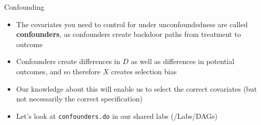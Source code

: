 \documentclass{beamer}
\begin{document}
\begin{frame}{Confounding}

  \begin{itemize}
  	\item The covariates you need to control for under unconfoundedness are called \textbf{confounders}, as confounders create backdoor paths from treatment to outcome
          \item Confounders create differences in $D$ as well as differences in potential outcomes, and so therefore $X$ creates selection bias \\

          \begin{center}
          \end{center}

          \item Our knowledge about this will enable us to select the correct covariates (but not necessarily the correct specification)
          \item Let's look at \texttt{confounders.do} in our shared labs (/Labs/DAGs)
  \end{itemize}
\end{frame}
\end{document}
